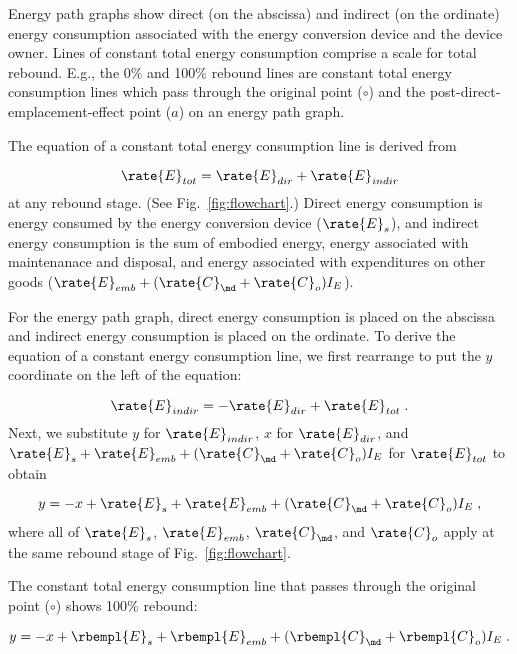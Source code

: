 Energy path graphs show direct (on the abscissa) and indirect (on the ordinate)
energy consumption associated with the energy conversion device 
and the device owner.
Lines of constant total energy consumption comprise a 
scale for total rebound.
E.g., the 0\% and 100\% rebound lines are constant total energy consumption
lines which pass through the original point ($\circ$) and
the post-direct-emplacement-effect point ($a$) 
on an energy path graph.

The equation of a constant total energy consumption line is derived from 

\begin{equation}
  \rate{E}_{tot} = \rate{E}_{dir} + \rate{E}_{indir}
\end{equation}
%
at any rebound stage. (See Fig.~\ref{fig:flowchart}.)
Direct energy consumption is energy consumed by the energy conversion device
($\rate{E}_s$), and 
indirect energy consumption is the sum of embodied energy, 
energy associated with maintenanace and disposal, and energy associated 
with expenditures on other goods
($\rate{E}_{emb} + (\rate{C}_{\md} + \rate{C}_o) I_E$).

For the energy path graph, 
direct energy consumption is placed on the abscissa and 
indirect energy consumption is placed on the ordinate.
To derive the equation of a constant energy consumption line, 
we first rearrange to put the $y$ coordinate on the left of the equation:

\begin{equation}
  \rate{E}_{indir} = - \rate{E}_{dir} + \rate{E}_{tot} \; .
\end{equation}
%
Next, we substitute $y$ for $\rate{E}_{indir}$,
$x$ for $\rate{E}_{dir}$, and 
$\rate{E}_s + \rate{E}_{emb} + (\rate{C}_{\md} + \rate{C}_o) I_E$ for $\rate{E}_{tot}$
to obtain

\begin{equation}
  y = -x + \rate{E}_s + \rate{E}_{emb} + (\rate{C}_{\md} + \rate{C}_o) I_E \; ,
\end{equation}
%
where all of $\rate{E}_s$, $\rate{E}_{emb}$, $\rate{C}_{\md}$, and $\rate{C}_o$
apply at the same rebound stage of Fig.~\ref{fig:flowchart}.

The constant total energy consumption line 
that passes through the original point ($\circ$)
shows 100\% rebound:

\begin{equation}
  y = -x + \rbempl{E}_s + \rbempl{E}_{emb} + (\rbempl{C}_{\md} + \rbempl{C}_o) I_E \; .
\end{equation}

